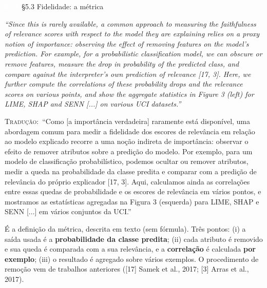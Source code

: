 \documentclass[11pt,a4paper]{article}
\newcommand{\pagechip}[1]{{\setlength{\fboxsep}{1.5pt}\colorbox{cAcc}{\textcolor{white}{\scriptsize\texttt{#1}}}}}
\newenvironment{origquote}{\par\itshape\small}{\par}
\newenvironment{tradquote}{\par\small\textsc{Tradução:}\ }{\par}
\newcommand{\explab}[1]{\par\smallskip{\small\color{cAcc}\textbf{\MakeUppercase{#1}}}\par}
\begin{document}
\begin{citacard}{\pagechip{p. 6} §5.3 Fidelidade: a métrica}
\begin{origquote}“Since this is rarely available, a common approach to measuring the faithfulness of relevance scores with respect to the model they are explaining relies on a proxy notion of importance: observing the effect of removing features on the model’s prediction. For example, for a probabilistic classification model, we can obscure or remove features, measure the drop in probability of the predicted class, and compare against the interpreter’s own prediction of relevance [17, 3]. Here, we further compute the correlations of these probability drops and the relevance scores on various points, and show the aggregate statistics in Figure 3 (left) for LIME, SHAP and SENN [...] on various UCI datasets.”\end{origquote}
\begin{tradquote}“Como [a importância verdadeira] raramente está disponível, uma abordagem comum para medir a fidelidade dos escores de relevância em relação ao modelo explicado recorre a uma noção indireta de importância: observar o efeito de remover atributos sobre a predição do modelo. Por exemplo, para um modelo de classificação probabilístico, podemos ocultar ou remover atributos, medir a queda na probabilidade da classe predita e comparar com a predição de relevância do próprio explicador [17, 3]. Aqui, calculamos ainda as correlações entre essas quedas de probabilidade e os escores de relevância em vários pontos, e mostramos as estatísticas agregadas na Figura 3 (esquerda) para LIME, SHAP e SENN [...] em vários conjuntos da UCI.”\end{tradquote}
\explab{Explicação}
É a definição da métrica, descrita em texto (sem fórmula). Três pontos: (i) a saída usada é a \textbf{probabilidade da classe predita}; (ii) cada atributo é removido e sua queda é comparada com a sua relevância, e a \textbf{correlação} é calculada \textbf{por exemplo}; (iii) o resultado é agregado sobre vários exemplos. O procedimento de remoção vem de trabalhos anteriores ([17] Samek et al., 2017; [3] Arras et al., 2017).
\end{citacard}
\end{document}
